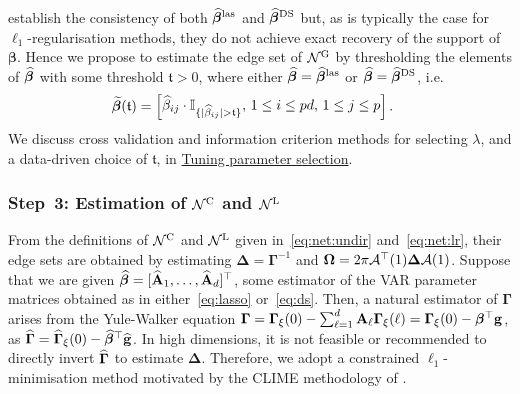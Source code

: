 \cite{barigozzi2022fnets} establish the consistency of both $\widehat{\bm\beta}^{\text{\upshape{las}}}$ and $\widehat{\bm\beta}^{\text{\upshape{DS}}}$ but, as is typically the case for $\ell_1$-regularisation methods, they do not achieve exact recovery of the support of $\bm\beta$.
Hence we propose to estimate the edge set of $\mathcal N^{\text{\upshape{G}}}$ by thresholding the elements of $\widehat{\bm\beta}$ with some threshold $\mathfrak{t} > 0$, where either $\widehat{\bm\beta} = \widehat{\bm\beta}^{\text{\upshape{las}}}$ or $\widehat{\bm\beta} = \widehat{\bm\beta}^{\text{\upshape{DS}}}$, i.e.\
\begin{align}
\label{eq:threshold}
\widetilde{\bm\beta}(\mathfrak{t}) &= 
\begin{bmatrix} \widehat{\beta}_{ij} \cdot \mathbb{I}_{\{\vert \widehat{\beta}_{ij} \vert > \mathfrak{t} \}},
\, 1 \le i \le pd, \, 1 \le j \le p \end{bmatrix}.
\end{align}
We discuss cross validation and information criterion methods for selecting $\lambda$, and a data-driven choice of $\mathfrak{t}$, in \hyperref[sec:tuning]{Tuning parameter selection}. 

\subsubsection{Step~3: Estimation of $\mathcal N^{\text{\upshape{C}}}$ and $\mathcal N^{\text{\upshape{L}}}$}
\label{sec:step:three}

From the definitions of $\mathcal N^{\text{\upshape{C}}}$ and $\mathcal N^{\text{\upshape{L}}}$ given in~\eqref{eq:net:undir} and~\eqref{eq:net:lr}, their edge sets are obtained by estimating $\bm\Delta = \bm\Gamma^{-1}$ and $\bm\Omega = 2\pi \mathcal A^\top(1) \bm\Delta \mathcal A(1)$.
Suppose that we are given $\widehat{\bm\beta} = [\widehat{\mathbf A}_1, \ldots, \widehat{\mathbf A}_d]^\top$, some estimator of the VAR parameter matrices obtained as in either~\eqref{eq:lasso} or~\eqref{eq:ds}.
Then, a natural estimator of $\bm\Gamma$ arises from the Yule-Walker equation
$\bm\Gamma = \bm\Gamma_\xi(0) - \sum_{\ell = 1}^{d} \mathbf A_{\ell} \bm\Gamma_\xi(\ell) = \bm\Gamma_\xi(0) - \bm\beta^\top {\mathbf g}$,
as $\widehat{\bm\Gamma} = \widehat{\bm\Gamma}_\xi(0) - \widehat{\bm\beta}^\top \widehat{\mathbf g}$.
In high dimensions, it is not feasible or recommended to directly invert $\widehat{\bm\Gamma}$ to estimate $\bm\Delta$.
Therefore, we adopt a constrained $\ell_1$-minimisation method motivated by the CLIME methodology of \cite{cai2011constrained}.

